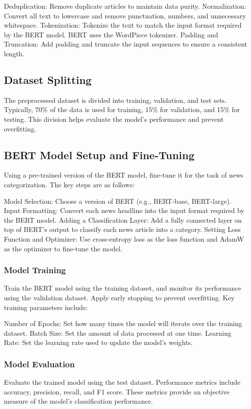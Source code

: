 \documentclass{article}
\begin{document}
Deduplication: Remove duplicate articles to maintain data purity.
Normalization: Convert all text to lowercase and remove punctuation, numbers, and unnecessary whitespace.
Tokenization: Tokenize the text to match the input format required by the BERT model. BERT uses the WordPiece tokenizer.
Padding and Truncation: Add padding and truncate the input sequences to ensure a consistent length.

\subsection{Dataset Splitting}

The preprocessed dataset is divided into training, validation, and test sets. Typically, 70\% of the data is used for training, 15\% for validation, and 15\% for testing. This division helps evaluate the model's performance and prevent overfitting.


\subsection{BERT Model Setup and Fine-Tuning}
Using a pre-trained version of the BERT model, fine-tune it for the task of news categorization. The key steps are as follows:

Model Selection: Choose a version of BERT (e.g., BERT-base, BERT-large).
Input Formatting: Convert each news headline into the input format required by the BERT model.
Adding a Classification Layer: Add a fully connected layer on top of BERT's output to classify each news article into a category.
Setting Loss Function and Optimizer: Use cross-entropy loss as the loss function and AdamW as the optimizer to fine-tune the model.

\subsubsection{Model Training}
Train the BERT model using the training dataset, and monitor its performance using the validation dataset. Apply early stopping to prevent overfitting. Key training parameters include:

Number of Epochs: Set how many times the model will iterate over the training dataset.
Batch Size: Set the amount of data processed at one time.
Learning Rate: Set the learning rate used to update the model's weights.

\subsubsection{Model Evaluation}
Evaluate the trained model using the test dataset. Performance metrics include accuracy, precision, recall, and F1 score. These metrics provide an objective measure of the model's classification performance.
\end{document}
